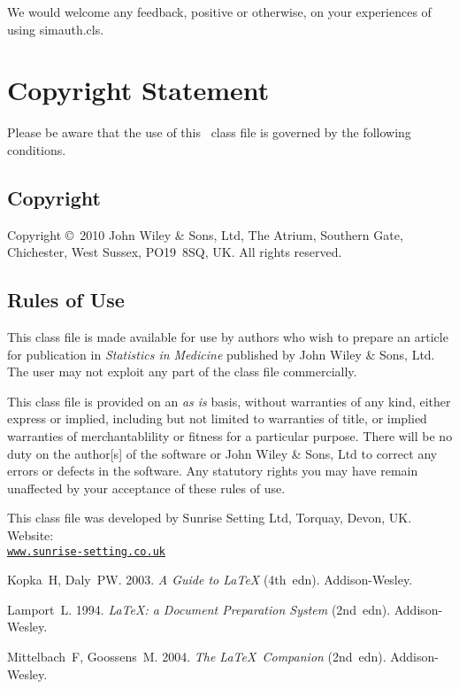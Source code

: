\documentclass[times]{simauth}
\begin{document}
\noindent We would welcome any feedback, positive or otherwise, on
your experiences of using \textsf{simauth.cls}.

\section{Copyright Statement}
Please  be  aware that the use of  this \LaTeXe\ class file is
governed by the following conditions.

\subsection{Copyright}
Copyright \copyright\ 2010 John Wiley \& Sons, Ltd, The Atrium,
Southern Gate, Chichester, West Sussex, PO19~8SQ, UK.   All rights
reserved.

\subsection{Rules of Use}
This class file is made available for use by authors who wish to
prepare an article for publication in \emph{Statistics in
Medicine} published by John Wiley \& Sons, Ltd.  The user may not
exploit any part of the class file commercially.

This class file is provided on an \emph{as is}  basis, without
warranties of any kind, either express or implied, including but
not limited to warranties of title, or implied  warranties of
merchantablility or fitness for a particular purpose. There will
be no duty on the author[s] of the software or  John Wiley \&
Sons, Ltd to correct any errors or defects in the software. Any
statutory  rights you may have remain unaffected by your
acceptance of these rules of use.

\ack This class file was developed by Sunrise Setting Ltd,
Torquay, Devon, UK. Website:\\
\href{http://www.sunrise-setting.co.uk}{\texttt{www.sunrise-setting.co.uk}}

\begin{thebibliography}{9}

 Kopka~H, Daly~PW. 2003. \emph{A Guide to \LaTeX} (4th~edn).
Addison-Wesley.

 Lamport~L. 1994. \emph{\LaTeX: a Document Preparation System} (2nd~edn).
Addison-Wesley.

 Mittelbach~F, Goossens~M. 2004. \emph{The \LaTeX\ Companion}
(2nd~edn). Addison-Wesley.
\end{thebibliography}
\end{document}
